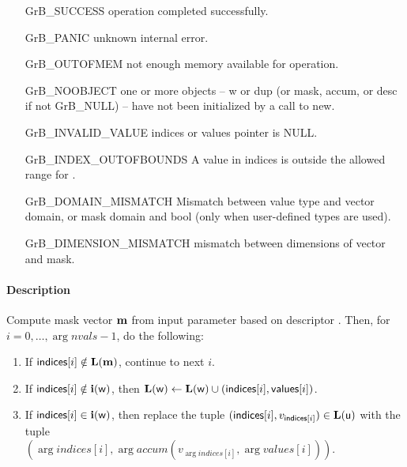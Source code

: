 \begin{itemize}[leftmargin=2.1in]
\item[{\sf GrB\_SUCCESS}]     operation completed successfully.
\item[{\sf GrB\_PANIC}]       unknown internal error.
\item[{\sf GrB\_OUTOFMEM}]    not enough memory available for operation.
\item[{\sf GrB\_NOOBJECT}]    one or more objects -- {\sf w} or {\sf dup} (or {\sf mask}, {\sf accum}, or {\sf desc} if not {\sf GrB\_NULL}) -- have not been initialized by a call to {\sf new}.
\item[{\sf GrB\_INVALID\_VALUE}]  {\sf indices} or {\sf values} pointer is {\sf NULL}.
\item[{\sf GrB\_INDEX\_OUTOFBOUNDS}]
                            A value in {\sf indices} is outside the allowed range for .
\item[\sf GrB\_DOMAIN\_MISMATCH]  
                       Mismatch between value type and vector domain, or mask domain and {\sf bool} (only when user-defined types are used).
\item[\sf GrB\_DIMENSION\_MISMATCH]  
                       mismatch between dimensions of vector and mask. 
\end{itemize}

\paragraph{Description}

Compute mask vector $\vector{m}$ from input parameter  based on descriptor .
Then, for $i = 0,\ldots,\arg{nvals}-1$, do the following:
\begin{enumerate}
    \item If $\arg{indices}[i] \notin \bold{L}(\vector{m})$, continue to next $i$.
    \item If $\arg{indices}[i] \notin \bold{i}(\arg{w})$, then $\bold{L}(\arg{w}) \leftarrow \bold{L}(\arg{w}) \cup (\arg{indices}[i], \arg{values}[i])$.
    \item If $\arg{indices}[i] \in \bold{i}(\arg{w})$, then replace the tuple $(\arg{indices}[i], v_{\arg{indices}[i]}) \in \bold{L}(\arg{u})$ with the tuple \\ $(\arg{indices}[i], \arg{accum}(v_{\arg{indices}[i]},\arg{values}[i]))$.
\end{enumerate}


